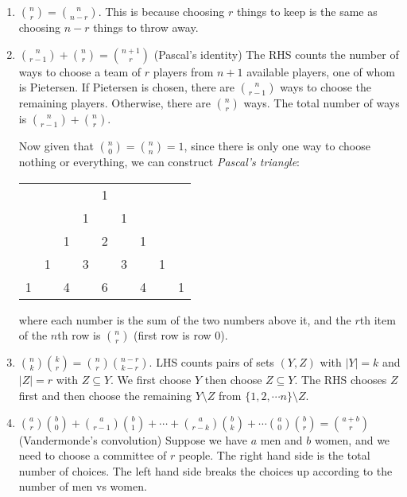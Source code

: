 \documentclass[a4paper]{article}
\begin{document}
  \begin{prop}\leavevmode
    \begin{enumerate}
      \item $\displaystyle\binom{n}{r} = \binom{n}{n - r}$. This is because choosing $r$ things to keep is the same as choosing $n - r$ things to throw away.
      \item $\displaystyle\binom{n }{r - 1} + \binom{n}{r} = \binom{n + 1}{r}$ (Pascal's identity) The RHS counts the number of ways to choose a team of $r$ players from $n + 1$ available players, one of whom is Pietersen. If Pietersen is chosen, there are $\binom{n}{r - 1}$ ways to choose the remaining players. Otherwise, there are $\binom{n}{r}$ ways. The total number of ways is $\binom{n}{r - 1} + \binom{n}{r}$.

        Now given that $\binom{n}{0} =\binom{n}{n}= 1$, since there is only one way to choose nothing or everything, we can construct \emph{Pascal's triangle}:
        \begin{center}
          \begin{tabular}{lllllllll}
            &   &   &   & 1 &   &   &   &   \\
            &   &   & 1 &   & 1 &   &   &   \\
            &   & 1 &   & 2 &   & 1 &   &   \\
            & 1 &   & 3 &   & 3 &   & 1 &   \\
            1 &   & 4 &   & 6 &   & 4 &   & 1 \\
          \end{tabular}
        \end{center}
        where each number is the sum of the two numbers above it, and the $r$th item of the $n$th row is $\binom{n}{r}$ (first row is row $0$).
      \item $\displaystyle\binom{n }{k}\binom{k }{r} = \binom{n}{r}\binom{n - r}{k - r}$. LHS counts pairs of sets $(Y, Z)$ with $|Y| = k$ and $|Z| = r$ with $Z\subseteq Y$. We first choose $Y$ then choose $Z\subseteq Y$. The RHS chooses $Z$ first and then choose the remaining $Y\setminus Z$ from $\{1, 2, \cdots n\}\setminus Z$.
      \item $\displaystyle \binom{a}{r}\binom{b}{0} + \binom{a}{r - 1}\binom{b}{1} + \cdots + \binom{a }{r - k}\binom{b}{k} + \cdots \binom{a}{0}\binom{b}{r} = \binom{a + b}{r}$ (Vandermonde's convolution) Suppose we have $a$ men and $b$ women, and we need to choose a committee of $r$ people. The right hand side is the total number of choices. The left hand side breaks the choices up according to the number of men vs women.
    \end{enumerate}
  \end{prop}
\end{document}
